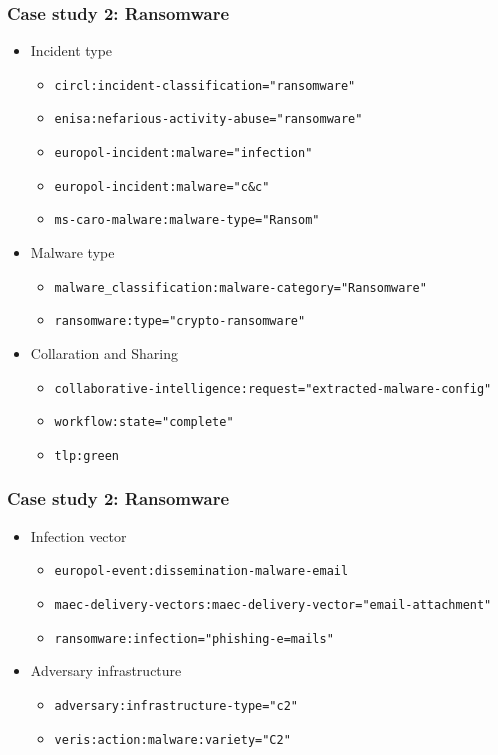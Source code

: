 \begin{frame}
    \frametitle{Case study 2: Ransomware}
    \begin{itemize}
        \item Incident type
        \begin{itemize}
            \item \texttt{circl:incident-classification="ransomware"}
            \item \texttt{enisa:nefarious-activity-abuse="ransomware"}
            \item \texttt{europol-incident:malware="infection"}
            \item \texttt{europol-incident:malware="c\&c"}
            \item \texttt{ms-caro-malware:malware-type="Ransom"}
        \end{itemize}
        \item Malware type
        \begin{itemize}
            \item \texttt{\scriptsize malware\_classification:malware-category="Ransomware"}
            \item \texttt{ransomware:type="crypto-ransomware"}
        \end{itemize}
        \item Collaration and Sharing
        \begin{itemize}
            \item \texttt{\tiny collaborative-intelligence:request="extracted-malware-config"}
            \item \texttt{workflow:state="complete"}
            \item \texttt{tlp:green}
        \end{itemize}
    \end{itemize}
\end{frame}

\begin{frame}
    \frametitle{Case study 2: Ransomware}
    \begin{itemize}
        \item Infection vector
        \begin{itemize}
            \item \texttt{europol-event:dissemination-malware-email}
            \item \texttt{\tiny maec-delivery-vectors:maec-delivery-vector="email-attachment"}
            \item \texttt{ransomware:infection="phishing-e=mails"}
        \end{itemize}
        \item Adversary infrastructure
        \begin{itemize}
            \item \texttt{adversary:infrastructure-type="c2"}
            \item \texttt{veris:action:malware:variety="C2"}
        \end{itemize}
    \end{itemize}
\end{frame}

